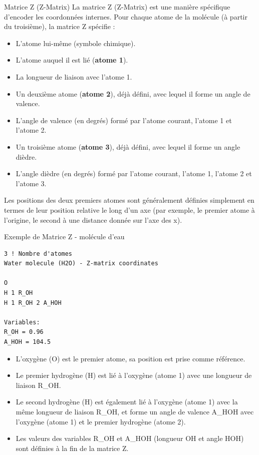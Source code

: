 \documentclass[12pt,a4paper]{article} %
\numberwithin{equation}{section} %
\numberwithin{figure}{section} %
\numberwithin{table}{section} %
\begin{document}
\begin{definition}{Matrice Z (Z-Matrix)}{}
La matrice Z (Z-Matrix) est une manière spécifique d'encoder les coordonnées internes. Pour chaque atome de la molécule (à partir du troisième), la matrice Z spécifie :
\begin{itemize}
 \item L'atome lui-même (symbole chimique).
 \item L'atome auquel il est lié (\textbf{atome 1}).
 \item La longueur de liaison avec l'atome 1.
 \item Un deuxième atome (\textbf{atome 2}), déjà défini, avec lequel il forme un angle de valence.
 \item L'angle de valence (en degrés) formé par l'atome courant, l'atome 1 et l'atome 2.
 \item Un troisième atome (\textbf{atome 3}), déjà défini, avec lequel il forme un angle dièdre.
 \item L'angle dièdre (en degrés) formé par l'atome courant, l'atome 1, l'atome 2 et l'atome 3.
\end{itemize}
Les positions des deux premiers atomes sont généralement définies simplement en termes de leur position relative le long d'un axe (par exemple, le premier atome à l'origine, le second à une distance donnée sur l'axe des x).
\end{definition}

\begin{example}{Exemple de Matrice Z - molécule d'eau }{}

\begin{verbatim}
3 ! Nombre d'atomes
Water molecule (H2O) - Z-matrix coordinates

O
H 1 R_OH
H 1 R_OH 2 A_HOH

Variables:
R_OH = 0.96
A_HOH = 104.5
\end{verbatim}

\begin{itemize}
\item L'oxygène (O) est le premier atome, sa position est prise comme référence.
\item Le premier hydrogène (H) est lié à l'oxygène (atome 1) avec une longueur de liaison R\_OH.
\item Le second hydrogène (H) est également lié à l'oxygène (atome 1) avec la même longueur de liaison R\_OH, et forme un angle de valence A\_HOH avec l'oxygène (atome 1) et le premier hydrogène (atome 2).
\item Les valeurs des variables R\_OH et A\_HOH (longueur OH et angle HOH) sont définies à la fin de la matrice Z.
\end{itemize}
\end{example}
\end{document}
